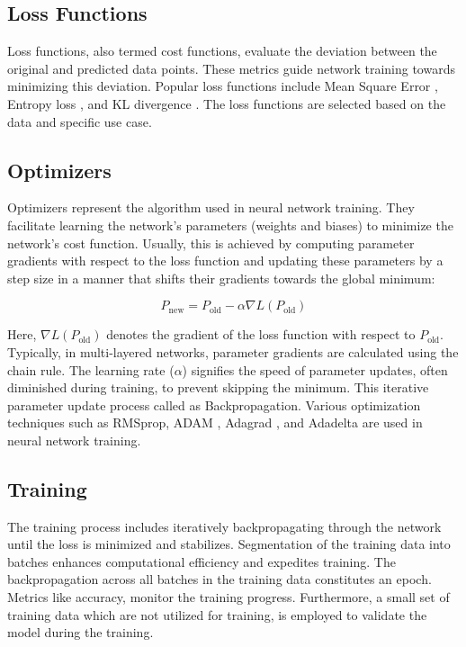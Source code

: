 \documentclass[12pt,twoside,a4paper,parskip]{scrbook} %
\begin{document}
\subsection{Loss Functions}
Loss functions, also termed cost functions, evaluate the deviation between the original and predicted data points. These metrics guide network training towards minimizing this deviation. Popular loss functions include Mean Square Error \cite{mse}, Entropy loss \cite{cel}, and KL divergence \cite{kl}. The loss functions are selected based on the data and specific use case.
\subsection{Optimizers}
Optimizers represent the algorithm used in neural network training. They facilitate learning the network's parameters (weights and biases) to minimize the network's cost function. Usually, this is achieved by computing parameter gradients with respect to the loss function and updating these parameters by a step size in a manner that shifts their gradients towards the global minimum:

\[P_{\text{new}} = P_{\text{old}} - \alpha \nabla L(P_{\text{old}})\]

Here, \(\nabla L(P_{\text{old}})\) denotes the gradient of the loss function with respect to \(P_{\text{old}}\). Typically, in multi-layered networks, parameter gradients are calculated using the chain rule. The learning rate (\(\alpha\)) signifies the speed of parameter updates, often diminished during training, to prevent skipping the minimum. This iterative parameter update process called as Backpropagation. Various optimization techniques such as RMSprop, ADAM \cite{adam}, Adagrad \cite{adagrad}, and Adadelta \cite{adadelta} are used in neural network training.

\subsection{Training}
The training process includes iteratively backpropagating through the network until the loss is minimized and stabilizes. Segmentation of the training data into batches enhances computational efficiency and expedites training. The backpropagation across all batches in the training data constitutes an epoch. Metrics like accuracy, monitor the training progress. Furthermore, a small set of training data which are not utilized for training, is employed to validate the model during the training.
\end{document}

